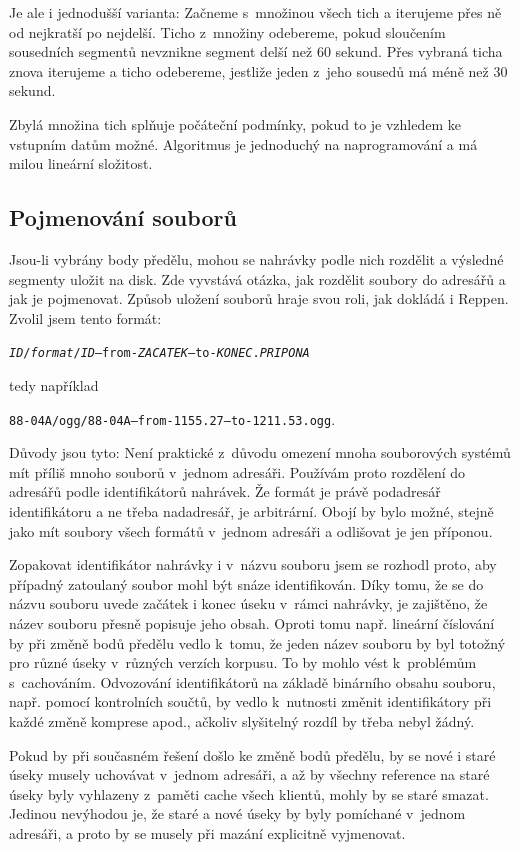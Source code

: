 Je ale i jednodušší varianta: Začneme s~množinou všech tich a iterujeme přes ně
od nejkratší po nejdelší. Ticho z~množiny odebereme, pokud sloučením sousedních
segmentů nevznikne segment delší než 60 sekund. Přes vybraná ticha znova
iterujeme a ticho odebereme, jestliže jeden z~jeho sousedů má méně než 30
sekund.

Zbylá množina tich splňuje počáteční podmínky, pokud to je vzhledem ke vstupním
datům možné. Algoritmus je jednoduchý na naprogramování a má milou
lineární složitost.

\subsection{Pojmenování souborů}

Jsou-li vybrány body předělu, mohou se nahrávky podle nich rozdělit a výsledné
segmenty uložit na disk. Zde vyvstává otázka, jak rozdělit soubory do adresářů a
jak je pojmenovat. Způsob uložení souborů hraje svou roli, jak dokládá i
Reppen\cite{reppen2010building}. Zvolil jsem tento formát:

\texttt{{\em{}ID}/{\em{}format}/{\em{}ID}--from-{\em{}ZACATEK}--to-{\em{}KONEC}.{\em{}PRIPONA}}

tedy například

\texttt{88-04A/ogg/88-04A--from-1155.27--to-1211.53.ogg}.

Důvody jsou tyto: Není praktické z~důvodu omezení mnoha souborových systémů mít
příliš mnoho souborů v~jednom adresáři. Používám proto rozdělení do adresářů podle
identifikátorů nahrávek. Že formát je právě podadresář identifikátoru a ne třeba
nadadresář, je arbitrární. Obojí by bylo možné, stejně jako mít soubory všech formátů
v~jednom adresáři a odlišovat je jen příponou.

Zopakovat identifikátor nahrávky i v~názvu souboru jsem se rozhodl proto, aby
případný zatoulaný soubor mohl být snáze identifikován. Díky tomu, že se do
názvu souboru uvede začátek i konec úseku v~rámci nahrávky, je zajištěno, že název
souboru přesně popisuje jeho obsah. Oproti tomu např. lineární číslování by při
změně bodů předělu vedlo k~tomu, že jeden název souboru by byl totožný pro různé
úseky v~různých verzích korpusu. To by mohlo vést k~problémům s~cachováním.
Odvozování identifikátorů na základě binárního obsahu souboru, např. pomocí
kontrolních součtů, by vedlo k~nutnosti změnit identifikátory při každé
změně komprese apod., ačkoliv slyšitelný rozdíl by třeba nebyl žádný.

Pokud by při současném řešení došlo ke změně bodů předělu, by se nové i staré úseky musely
uchovávat v~jednom adresáři, a až by všechny reference na staré úseky byly
vyhlazeny z~paměti cache všech klientů, mohly by se staré smazat. Jedinou
nevýhodou je, že staré a nové úseky by byly pomíchané v~jednom adresáři, a proto
by se musely při mazání explicitně vyjmenovat.

